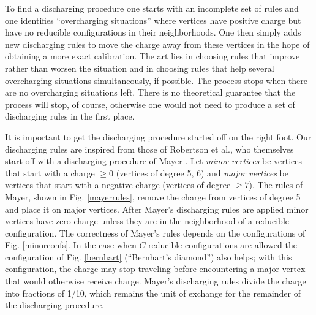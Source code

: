 \documentclass[11pt]{article}
\begin{document}
To find a discharging procedure one starts with an incomplete set of rules and one identifies 
``overcharging situations'' where vertices have positive charge but have no reducible configurations in their neighborhoods. One then simply adds new discharging rules to move the charge away from these vertices in the hope of obtaining a more exact calibration. The art lies in choosing rules that improve rather than worsen the situation and in choosing rules that help several overcharging situations simultaneously, if possible. The process stops when there are no overcharging situations left. There is no theoretical guarantee that the process will stop, of course, otherwise one would not need to produce a set of discharging rules in the first place.

\mayerfig
\bernhartfig
\minorconfsfig

It is important to get the discharging procedure started off on the right foot. Our discharging rules are inspired from those of Robertson et al., who themselves start off with a discharging procedure of Mayer \cite{mayer}. 
Let \emph{minor vertices} be vertices that start with a charge $\geq 0$ (vertices of degree 5, 6) and \emph{major vertices} be vertices that start with a negative charge (vertices of degree $\geq 7$). 
The rules of Mayer, shown in Fig$.$ \ref{mayerrules}, remove the charge from vertices of degree 5 and place it on major vertices. After Mayer's discharging rules are applied 
minor vertices 
have zero charge unless they are in the neighborhood of a reducible configuration. 
The correctness of Mayer's rules depends on the configurations of Fig$.$ \ref{minorconfs}. 
In the case when $C$-reducible configurations are allowed the configuration of Fig$.$ \ref{bernhart} (``Bernhart's diamond'') also helps; with this configuration, the charge may stop traveling before encountering a major vertex that would otherwise receive charge. Mayer's discharging rules divide the charge into fractions of 1/10, which remains the unit of exchange for the remainder of the discharging procedure.
\end{document}
